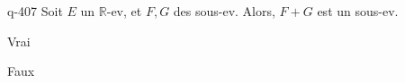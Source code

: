 \begin{truefalse}{q-407}
Soit $E$ un $\mathbb R$-ev, et $F,G$ des sous-ev. Alors, $F + G$ est un sous-ev.
\item* Vrai
\item Faux
\end{truefalse}

